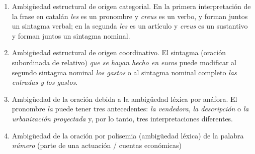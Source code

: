 \begin{enumerate}
\begin{enumerate}
\item Ambigüedad estructural de origen categorial. En la primera interpretación de la frase en catalán \emph{les} es un pronombre y \emph{creus} es un verbo, y forman juntos un sintagma verbal; en la segunda \emph{les} es un artículo y \emph{creus} es un sustantivo y forman juntos un sintagma nominal. \item Ambigüedad estructural de origen coordinativo. El sintagma (oración subordinada de relativo) \emph{que se hayan hecho en euros} puede modificar al segundo sintagma nominal \emph{los gastos} o al sintagma nominal completo \emph{las entradas y los gastos}. \item Ambigüedad de la oración debida a la ambigüedad léxica por anáfora. El pronombre \emph{la} puede tener tres antecedentes: \emph{la vendedora}, \emph{la descripción} o \emph{la urbanización proyectada} y, por lo tanto, tres interpretaciones diferentes. 

\item Ambigüedad de la oración por polisemia (ambigüedad léxica) de la palabra \emph{número} (parte de una actuación / cuentas económicas) 


\end{enumerate}
\end{enumerate}
